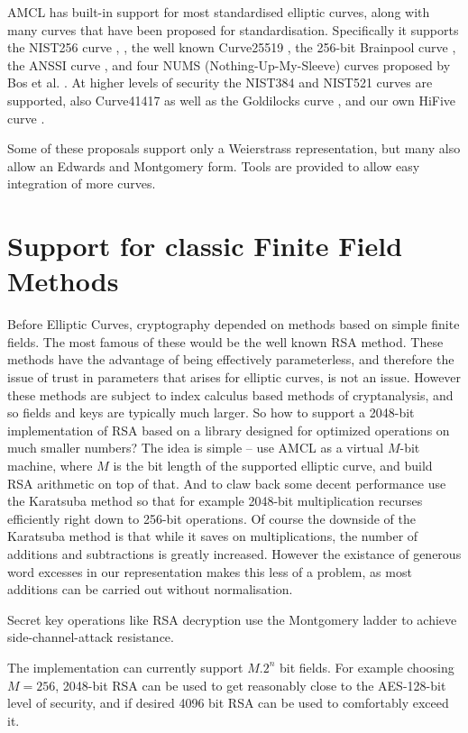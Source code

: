 \documentclass{llncs}
\begin{document}
AMCL has built-in support for most standardised elliptic curves, along with many curves that have been proposed for standardisation. 
Specifically it supports the NIST256 curve \cite{certicom}, \cite{nist}, the well known Curve25519 \cite{bernstein}, the 256-bit Brainpool curve \cite{brainpool}, the ANSSI curve \cite{ANSSI}, and four
NUMS (Nothing-Up-My-Sleeve) curves proposed by Bos et al. \cite{bos-costello-longa-naehrig}. At higher levels of security the NIST384 and NIST521 curves are supported, also 
Curve41417 \cite{bernstein-chuengsatiansup-lange} as well as the Goldilocks curve \cite{hamburg}, and our own
Hi{F}ive curve \cite{scott3}.

Some of these proposals support only a Weierstrass representation, but many also allow an Edwards and Montgomery 
form. Tools are provided to allow easy integration of more curves.


\section{Support for classic Finite Field Methods}

Before Elliptic Curves, cryptography depended on methods based on simple finite fields. The most famous of these would be the well known RSA method. These methods have the advantage of
being effectively parameterless, and therefore the issue of trust in parameters that arises for elliptic curves, is not an issue. However these methods are subject to index calculus based
methods of cryptanalysis, and so fields and keys are typically much larger. So how to support a 2048-bit implementation of RSA based on a library designed for optimized operations on much smaller numbers? 
The idea is simple --
use AMCL as a virtual $M$-bit machine, where $M$ is the bit length of the supported elliptic curve, and build RSA arithmetic on top of that. And to claw back some decent performance use the Karatsuba 
method \cite{knuth} so that for example 2048-bit multiplication
recurses efficiently right down to 256-bit operations. Of course the downside of the Karatsuba method is that while it saves on multiplications, the number of additions and subtractions is greatly increased.
However the existance of generous word excesses in our representation makes this less of a problem, as most additions can be carried out without normalisation. 

Secret key operations like RSA decryption use the Montgomery ladder to achieve side-channel-attack resistance.

The implementation can currently support $M.2^n$ bit fields. For example choosing $M=256$, 2048-bit RSA can be used to get reasonably close to the AES-128-bit level of security, and if desired 4096 bit RSA can be used to
comfortably exceed it. 
\end{document}
